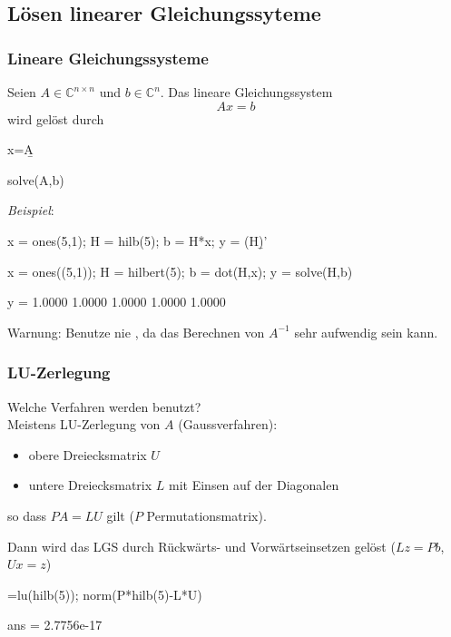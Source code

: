 \documentclass[hyperref={xetex}]{beamer}
\begin{document}
\subsection{Lösen linearer Gleichungssyteme}
% 
%
\begin{frame}[fragile]\frametitle{Lineare Gleichungssysteme}
Seien $A \in \mathbb{C}^{n\times n}$ und $b \in \mathbb{C}^n$. Das
lineare Gleichungssystem 
{ \[ A x=b \]}
wird gelöst durch  
\begin{matlabin}
x=A\b
\end{matlabin}
\begin{pyin}
solve(A,b)
\end{pyin}
\textsl{Beispiel}:

\begin{matlabin}
x = ones(5,1); H = hilb(5); b = H*x; y = (H\b)'
\end{matlabin}
\begin{pyin}
x = ones((5,1)); H = hilbert(5); b = dot(H,x); y = solve(H,b)  
\end{pyin}
\begin{matlab}
y = 1.0000    1.0000    1.0000    1.0000    1.0000
\end{matlab}

\alert{Warnung:} Benutze nie
, da das Berechnen von $A^{-1}$ sehr aufwendig sein kann.
\end{frame}
% 
%
\begin{frame}[fragile]\frametitle{LU-Zerlegung}
{\centering  Welche Verfahren werden benutzt?}\\[0.5cm]

Meistens LU-Zerlegung von $A$ (Gaussverfahren):
\begin{itemize}
 \item obere Dreiecksmatrix $U$
 \item untere Dreiecksmatrix $L$ mit Einsen auf der Diagonalen
\end{itemize}
so dass $PA=LU$ gilt ($P$ Permutationsmatrix).

Dann wird das LGS durch Rückwärts- und Vorwärtseinsetzen gelöst
($Lz = Pb$, $Ux = z$)

\begin{matlabin}
[L,U,P]=lu(hilb(5)); norm(P*hilb(5)-L*U)
\end{matlabin}
\begin{matlab}
ans =  2.7756e-17
\end{matlab}
\end{frame}
% 
%
\end{document}
